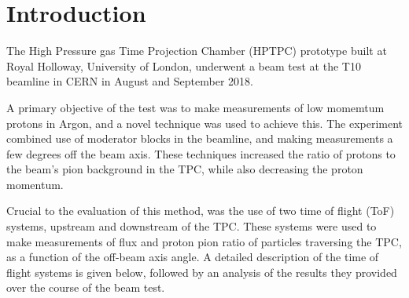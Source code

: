 \section{Introduction}

The High Pressure gas Time Projection Chamber (HPTPC) prototype built at Royal Holloway, University of London, underwent a beam test at the T10 beamline in CERN in August and September 2018.

A primary objective of the test was to make measurements of low momemtum protons in Argon, and a novel technique was used to achieve this.
The experiment combined use of moderator blocks in the beamline, and making measurements a few degrees off the beam axis.
These techniques increased the ratio of protons to the beam's pion background in the TPC, while also decreasing the proton momentum.

Crucial to the evaluation of this method, was the use of two time of flight (ToF) systems, upstream and downstream of the TPC.
These systems were used to make measurements of flux and proton pion ratio of particles traversing the TPC, as a function of the off-beam axis angle.
A detailed description of the time of flight systems is given below, followed by an analysis of the results they provided over the course of the beam test.